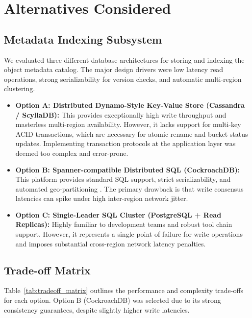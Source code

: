\section{Alternatives Considered}

\subsection{Metadata Indexing Subsystem}
We evaluated three different database architectures for storing and indexing the object metadata catalog. The major design drivers were low latency read operations, strong serializability for version checks, and automatic multi-region clustering.

\begin{itemize}
    \item \textbf{Option A: Distributed Dynamo-Style Key-Value Store (Cassandra / ScyllaDB):} This provides exceptionally high write throughput and masterless multi-region availability. However, it lacks support for multi-key ACID transactions, which are necessary for atomic rename and bucket status updates. Implementing transaction protocols at the application layer was deemed too complex and error-prone.
    \item \textbf{Option B: Spanner-compatible Distributed SQL (CockroachDB):} This platform provides standard SQL support, strict serializability, and automated geo-partitioning \cite{rostova2023metadata}. The primary drawback is that write consensus latencies can spike under high inter-region network jitter.
    \item \textbf{Option C: Single-Leader SQL Cluster (PostgreSQL + Read Replicas):} Highly familiar to development teams and robust tool chain support. However, it represents a single point of failure for write operations and imposes substantial cross-region network latency penalties.
\end{itemize}

\subsection{Trade-off Matrix}
Table~\ref{tab:tradeoff_matrix} outlines the performance and complexity trade-offs for each option. Option B (CockroachDB) was selected due to its strong consistency guarantees, despite slightly higher write latencies.

